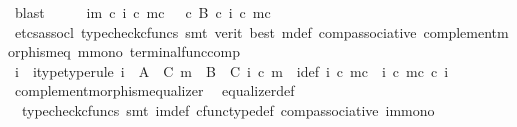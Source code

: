 \begin{isabellebody}
\ blast\isanewline
\ \ \isamarkupfalse%
\ \isamarkupfalse%
\ {\isachardoublequoteopen}{\isasymchi}im\ {\isasymcirc}\isactrlsub c\ {\isacharparenleft}{\kern0pt}i\ {\isasymcirc}\isactrlsub c\ m\isactrlsup c{\isacharparenright}{\kern0pt}\ {\isacharequal}{\kern0pt}\ {\isasymf}\ {\isasymcirc}\isactrlsub c\ {\isasymbeta}\isactrlbsub B\isactrlesub \ {\isasymcirc}\isactrlsub c\ {\isacharparenleft}{\kern0pt}i\ {\isasymcirc}\isactrlsub c\ m\isactrlsup c{\isacharparenright}{\kern0pt}{\isachardoublequoteclose}\isanewline
\ \ \ \ \isamarkupfalse%
\ {\isacharparenleft}{\kern0pt}etcs{\isacharunderscore}{\kern0pt}assocl{\isacharcomma}{\kern0pt}\ typecheck{\isacharunderscore}{\kern0pt}cfuncs{\isacharcomma}{\kern0pt}\ smt\ {\isacharparenleft}{\kern0pt}verit{\isacharcomma}{\kern0pt}\ best{\isacharparenright}{\kern0pt}\ {\isasymchi}m{\isacharunderscore}{\kern0pt}def\ comp{\isacharunderscore}{\kern0pt}associative{}\ complement{\isacharunderscore}{\kern0pt}morphism{\isacharunderscore}{\kern0pt}eq\ m{\isacharunderscore}{\kern0pt}mono\ terminal{\isacharunderscore}{\kern0pt}func{\isacharunderscore}{\kern0pt}comp{\isacharparenright}{\kern0pt}\isanewline
\ \ \isamarkupfalse%
\ \isamarkupfalse%
\ i{\isacharprime}{\kern0pt}\ \ i{\isacharprime}{\kern0pt}{\isacharunderscore}{\kern0pt}type{\isacharbrackleft}{\kern0pt}type{\isacharunderscore}{\kern0pt}rule{\isacharbrackright}{\kern0pt}{\isacharcolon}{\kern0pt}\ {\isachardoublequoteopen}i{\isacharprime}{\kern0pt}\ {\isacharcolon}{\kern0pt}\ A\ {\isasymsetminus}\ {\isacharparenleft}{\kern0pt}C{\isacharcomma}{\kern0pt}\ m{\isacharparenright}{\kern0pt}\ {\isasymrightarrow}\ B\ {\isasymsetminus}\ {\isacharparenleft}{\kern0pt}C{\isacharcomma}{\kern0pt}\ i\ {\isasymcirc}\isactrlsub c\ m{\isacharparenright}{\kern0pt}{\isachardoublequoteclose}\ \ i{\isacharprime}{\kern0pt}{\isacharunderscore}{\kern0pt}def{\isacharcolon}{\kern0pt}\ {\isachardoublequoteopen}i\ {\isasymcirc}\isactrlsub c\ m\isactrlsup c\ {\isacharequal}{\kern0pt}\ {\isacharparenleft}{\kern0pt}i\ {\isasymcirc}\isactrlsub c\ m{\isacharparenright}{\kern0pt}\isactrlsup c\ {\isasymcirc}\isactrlsub c\ i{\isacharprime}{\kern0pt}{\isachardoublequoteclose}\isanewline
\ \ \ \ \isamarkupfalse%
\ complement{\isacharunderscore}{\kern0pt}morphism{\isacharunderscore}{\kern0pt}equalizer\ \isamarkupfalse%
\ equalizer{\isacharunderscore}{\kern0pt}def\isanewline
\ \ \ \ \isamarkupfalse%
\ {\isacharparenleft}{\kern0pt}{\isacharminus}{\kern0pt}{\isacharcomma}{\kern0pt}\ typecheck{\isacharunderscore}{\kern0pt}cfuncs{\isacharcomma}{\kern0pt}\ smt\ {\isasymchi}im{\isacharunderscore}{\kern0pt}def\ cfunc{\isacharunderscore}{\kern0pt}type{\isacharunderscore}{\kern0pt}def\ comp{\isacharunderscore}{\kern0pt}associative{}\ im{\isacharunderscore}{\kern0pt}mono{\isacharparenright}{\kern0pt}\isanewline

\end{isabellebody}
